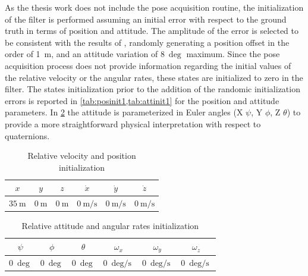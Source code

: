 As the thesis work does not include the pose acquisition routine, the initialization of the filter is performed assuming an initial error with respect to the ground truth in terms of position and attitude. The amplitude of the error is selected to be consistent with the results of \cite{pesce2019autonomous}, randomly generating a position offset in the order of \SI{1}{\meter}, and an attitude variation of $\SI{8}{\deg}$ maximum. Since the pose acquisition process does not provide information regarding the initial values of the relative velocity or the angular rates, these states are initialized to zero in the filter. The states initialization prior to the addition of the randomic initialization errors is reported in \cref{tab:posinit1,tab:attinit1} for the position and attitude parameters. In \cref{tab:attinit1} the attitude is parameterized in Euler angles (X $\psi$, Y $\phi$, Z $\theta$) to provide a more straightforward physical interpretation with respect to quaternions.\\

\begin{table}[!h]
    \centering
    \begin{tabular}{ c c c c c c}
        $x$ & $y$ & $z$ & $\dot{x}$ & $\dot{y}$ & $\dot{z}$ \\\hline\hline
        $\SI{35}{\meter}$ & $\SI{0}{\meter}$ & $\SI{0}{\meter}$ & $\SI{0}{\meter\per\second}$ & $\SI{0}{\meter\per\second}$ & $\SI{0}{\meter\per\second}$  \\\hline
    \end{tabular}
    \caption{Relative velocity and position initialization}
    \label{tab:posinit1}
\end{table}
\begin{table}[!h]
    \centering
    \begin{tabular}{c c c c c c}
         $\psi$ & $\phi$ & $\theta$ & $\omega_x$ & $\omega_y$ & $\omega_z$\\\hline\hline
         $\SI{0}{\deg}$ & $\SI{0}{\deg}$ & $\SI{0}{\deg}$ & $\SI{0}{\deg\per\second}$  & $\SI{0}{\deg\per\second}$   & $\SI{0}{\deg\per\second}$ \\\hline
    \end{tabular}
    \caption{Relative attitude and angular rates initialization}
    \label{tab:attinit1}
\end{table}

